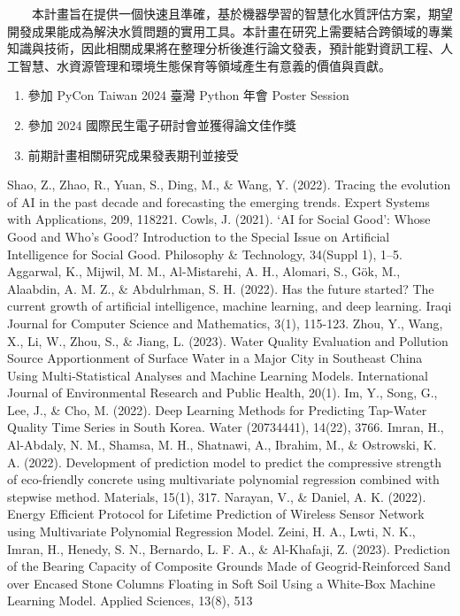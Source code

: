 \documentclass[12pt,a4paper]{article}
\begin{document}
\begin{enumerate}
\begin{enumerate}[label=\arabic*.]
　　本計畫旨在提供一個快速且準確，基於機器學習的智慧化水質評估方案，期望開發成果能成為解決水質問題的實用工具。本計畫在研究上需要結合跨領域的專業知識與技術，因此相關成果將在整理分析後進行論文發表，預計能對資訊工程、人工智慧、水資源管理和環境生態保育等領域產生有意義的價值與貢獻。
    \begin{enumerate}[label=3-3-\arabic*.]
        \item 參加 PyCon Taiwan 2024 臺灣 Python 年會 Poster Session
        \item 參加 2024 國際民生電子研討會並獲得論文佳作獎
        \item 前期計畫相關研究成果發表期刊並接受
    \end{enumerate}
\end{enumerate}

\begin{thebibliography}{99}
 Shao, Z., Zhao, R., Yuan, S., Ding, M., \& Wang, Y. (2022). Tracing the evolution of AI in the past decade and forecasting the emerging trends. Expert Systems with Applications, 209, 118221.
 Cowls, J. (2021). ‘AI for Social Good’: Whose Good and Who’s Good? Introduction to the Special Issue on Artificial Intelligence for Social Good. Philosophy \& Technology, 34(Suppl 1), 1–5.
 Aggarwal, K., Mijwil, M. M., Al-Mistarehi, A. H., Alomari, S., Gök, M., Alaabdin, A. M. Z., \& Abdulrhman, S. H. (2022). Has the future started? The current growth of artificial intelligence, machine learning, and deep learning. Iraqi Journal for Computer Science and Mathematics, 3(1), 115-123.
 Zhou, Y., Wang, X., Li, W., Zhou, S., \& Jiang, L. (2023). Water Quality Evaluation and Pollution Source Apportionment of Surface Water in a Major City in Southeast China Using Multi-Statistical Analyses and Machine Learning Models. International Journal of Environmental Research and Public Health, 20(1).
 Im, Y., Song, G., Lee, J., \& Cho, M. (2022). Deep Learning Methods for Predicting Tap-Water Quality Time Series in South Korea. Water (20734441), 14(22), 3766.
 Imran, H., Al-Abdaly, N. M., Shamsa, M. H., Shatnawi, A., Ibrahim, M., \& Ostrowski, K. A. (2022). Development of prediction model to predict the compressive strength of eco-friendly concrete using multivariate polynomial regression combined with stepwise method. Materials, 15(1), 317.
 Narayan, V., \& Daniel, A. K. (2022). Energy Efficient Protocol for Lifetime Prediction of Wireless Sensor Network using Multivariate Polynomial Regression Model.
 Zeini, H. A., Lwti, N. K., Imran, H., Henedy, S. N., Bernardo, L. F. A., \& Al-Khafaji, Z. (2023). Prediction of the Bearing Capacity of Composite Grounds Made of Geogrid-Reinforced Sand over Encased Stone Columns Floating in Soft Soil Using a White-Box Machine Learning Model. Applied Sciences, 13(8), 513

\end{thebibliography}
\end{enumerate}
\end{document}
